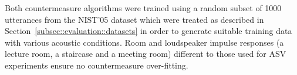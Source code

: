 
Both countermeasure algorithms were trained using a random subset of 1000 utterances from the NIST'05 dataset which were treated as described in Section~\ref{subsec::evaluation::datasets} in order to generate suitable training data with various acoustic conditions.  %
Room and loudspeaker impulse responses (a lecture room, a staircase and a meeting room) different to those used for ASV experiments ensure no countermeasure over-fitting.



